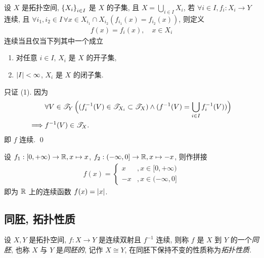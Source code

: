     \begin{Theorem}[拼接定理]
        设 $ X $ 是拓扑空间, $ \left\{ X_{i} \right\}_{i\in I} $ 是 $ X $ 的子集, 且 $ X=\bigcup_{i\in I}X_{i} $, 若 $ \forall i\in I, f_{i}:X_{i}\to Y $ 连续, 且 $ \forall i_{1}, i_{2}\in I\, \forall x\in X_{i_{1}}\cap X_{i_{2}}(f_{i_{1}}(x)=f_{i_{2}}(x)) $, 则定义
        \begin{align*}
            f(x)=f_{i}(x), \quad x\in X_{i}
        \end{align*}
        连续当且仅当下列其中一个成立
        \begin{enumerate}
            \item 对任意 $ i\in I $, $ X_{i} $ 是 $ X $ 的开子集,
            \item $ \left| I \right| <\infty $, $ X_{i} $ 是 $ X $ 的闭子集.
        \end{enumerate}
    \end{Theorem}
    \begin{Proof}
        只证 (1). 因为
        \begin{align*}
            & \forall V\in\mathscr{T}_{Y}\,\Big((f_{i}^{-1}(V)\in\mathscr{T}_{X_{i}}\subset\mathscr{T}_{X})\land (f^{-1}(V)=\bigcup_{i\in I}f_{i}^{-1}(V))\Big)\\
            \Longrightarrow{} & f^{-1}(V)\in\mathscr{T}_{X}.
        \end{align*}
        即 $ f $ 连续. \qed
    \end{Proof}

    \begin{Example}
        设 $ f_{1}: [0, +\infty)\to \mathbb{R}, x\mapsto x $, $ f_{2}:(-\infty, 0]\to \mathbb{R}, x\mapsto -x $, 则作拼接
        \begin{align*}
            f(x)=\begin{cases}
                x & ,x\in[0, +\infty)\\
                -x & , x\in(-\infty, 0]
            \end{cases}
        \end{align*}
        即为 $ \mathbb{R} $ 上的连续函数 $ f(x)=\left| x \right|  $.
    \end{Example}

\subsection{同胚, 拓扑性质}
    \begin{Definition}[同胚]
        设 $ X, Y $ 是拓扑空间, $ f: X\to Y $ 是连续双射且 $ f^{-1} $ 连续, 则称 $ f $ 是 $ X $ 到 $ Y $ 的一个\emph{同胚}, 也称 $ X $ 与 $ Y $ 是\emph{同胚的}, 记作 $ X\cong Y $, 在同胚下保持不变的性质称为\emph{拓扑性质}.
    \end{Definition}


